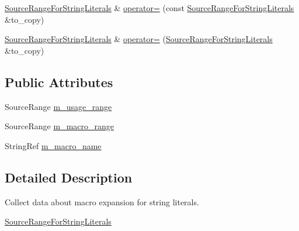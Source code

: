 \begin{DoxyCompactItemize}
\hyperlink{classclang_1_1tidy_1_1pagesjaunes_1_1_exec_s_q_l_prepare_fmtd_to_function_call_1_1_source_range_for_string_literals}{Source\+Range\+For\+String\+Literals} \& \hyperlink{classclang_1_1tidy_1_1pagesjaunes_1_1_exec_s_q_l_prepare_fmtd_to_function_call_1_1_source_range_for_string_literals_adfbb215b2ced1a4e3388196c0faf791c}{operator=} (const \hyperlink{classclang_1_1tidy_1_1pagesjaunes_1_1_exec_s_q_l_prepare_fmtd_to_function_call_1_1_source_range_for_string_literals}{Source\+Range\+For\+String\+Literals} \&to\+\_\+copy)
\item 
\hyperlink{classclang_1_1tidy_1_1pagesjaunes_1_1_exec_s_q_l_prepare_fmtd_to_function_call_1_1_source_range_for_string_literals}{Source\+Range\+For\+String\+Literals} \& \hyperlink{classclang_1_1tidy_1_1pagesjaunes_1_1_exec_s_q_l_prepare_fmtd_to_function_call_1_1_source_range_for_string_literals_afa999c9ce9572562f1c7c3f086776203}{operator=} (\hyperlink{classclang_1_1tidy_1_1pagesjaunes_1_1_exec_s_q_l_prepare_fmtd_to_function_call_1_1_source_range_for_string_literals}{Source\+Range\+For\+String\+Literals} \&to\+\_\+copy)
\end{DoxyCompactItemize}
\subsection*{Public Attributes}
\begin{DoxyCompactItemize}
\item 
Source\+Range \hyperlink{classclang_1_1tidy_1_1pagesjaunes_1_1_exec_s_q_l_prepare_fmtd_to_function_call_1_1_source_range_for_string_literals_ad05857763dfad877aa064d3c9431a28d}{m\+\_\+usage\+\_\+range}
\item 
Source\+Range \hyperlink{classclang_1_1tidy_1_1pagesjaunes_1_1_exec_s_q_l_prepare_fmtd_to_function_call_1_1_source_range_for_string_literals_acb0d8a3c628c2707a2d9f7a00f45d5c9}{m\+\_\+macro\+\_\+range}
\item 
String\+Ref \hyperlink{classclang_1_1tidy_1_1pagesjaunes_1_1_exec_s_q_l_prepare_fmtd_to_function_call_1_1_source_range_for_string_literals_a319e4847ac1dc252cfda3347c54f910f}{m\+\_\+macro\+\_\+name}
\end{DoxyCompactItemize}


\subsection{Detailed Description}
Collect data about macro expansion for string literals. 

\hyperlink{classclang_1_1tidy_1_1pagesjaunes_1_1_exec_s_q_l_prepare_fmtd_to_function_call_1_1_source_range_for_string_literals}{Source\+Range\+For\+String\+Literals}

